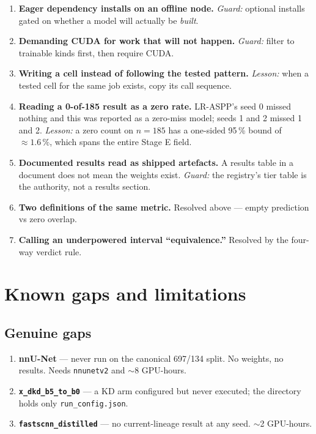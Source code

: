 \documentclass[11pt]{article}
\begin{document}
\begin{enumerate}[leftmargin=*,itemsep=3pt]
\item \textbf{Eager dependency installs on an offline node.} \emph{Guard:}
optional installs gated on whether a model will actually be \emph{built}.

\item \textbf{Demanding CUDA for work that will not happen.} \emph{Guard:} filter
to trainable kinds first, then require CUDA.

\item \textbf{Writing a cell instead of following the tested pattern.}
\emph{Lesson:} when a tested cell for the same job exists, copy its call
sequence.

\item \textbf{Reading a 0-of-185 result as a zero rate.} LR-ASPP's seed 0 missed
nothing and this was reported as a zero-miss model; seeds 1 and 2 missed 1 and 2.
\emph{Lesson:} a zero count on $n=185$ has a one-sided 95\,\% bound of
$\approx1.6\,\%$, which spans the entire Stage E field.

\item \textbf{Documented results read as shipped artefacts.} A results table in a
document does not mean the weights exist. \emph{Guard:} the registry's tier table
is the authority, not a results section.

\item \textbf{Two definitions of the same metric.} Resolved above --- empty
prediction vs zero overlap.

\item \textbf{Calling an underpowered interval ``equivalence.''} Resolved by the
four-way verdict rule.
\end{enumerate}

\section{Known gaps and limitations}

\subsection{Genuine gaps}
\begin{enumerate}[leftmargin=*,itemsep=2pt]
\item \textbf{nnU-Net} --- never run on the canonical 697/134 split. No weights,
no results. Needs \texttt{nnunetv2} and $\sim$8 GPU-hours.
\item \textbf{\texttt{x\_dkd\_b5\_to\_b0}} --- a KD arm configured but never
executed; the directory holds only \texttt{run\_config.json}.
\item \textbf{\texttt{fastscnn\_distilled}} --- no current-lineage result at any
seed. $\sim$2 GPU-hours.
\end{enumerate}
\end{document}
